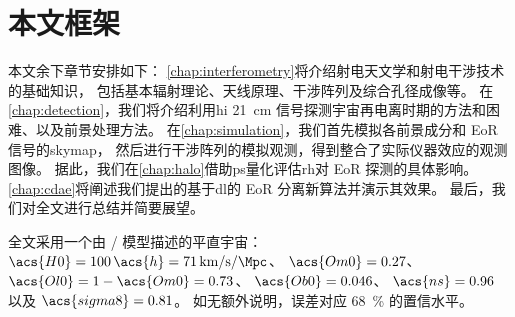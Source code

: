 \section{本文框架}
\label{sec:structure}

本文余下章节安排如下：
\autoref{chap:interferometry}将介绍射电天文学和射电干涉技术的基础知识，
包括基本辐射理论、天线原理、干涉阵列及综合孔径成像等。
在\autoref{chap:detection}，我们将介绍利用\acl{hi} \SI{21}{\cm}
信号探测宇宙再电离时期的方法和困难、以及前景处理方法。
在\autoref{chap:simulation}，我们首先模拟各前景成分和 EoR 信号的\acl{skymap}，
然后进行干涉阵列的模拟观测，得到整合了实际仪器效应的观测图像。
据此，我们在\autoref{chap:halo}借助\acl{ps}量化评估\acl{rh}对
EoR 探测的具体影响。
\autoref{chap:cdae}将阐述我们提出的基于\acl{dl}的 EoR 分离新算法并演示其效果。
最后，我们对全文进行总结并简要展望。

全文采用一个由 \lcdm/ 模型描述的平直宇宙：
$\acs{H0} = 100\,\acs{h} = \SI{71}{\km\per\second\per\Mpc}$、
$\acs{Om0} = 0.27$、
$\acs{Ol0} = 1 - \acs{Om0} = 0.73$、
$\acs{Ob0} = 0.046$、
$\acs{ns} = 0.96$ 以及 $\acs{sigma8} = 0.81$。
如无额外说明，误差对应 \SI{68}{\percent} 的置信水平。



